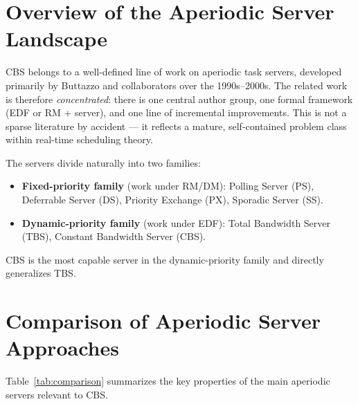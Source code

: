 \documentclass[conference]{IEEEtran}
\begin{document}
\section{Overview of the Aperiodic Server Landscape}

CBS belongs to a well-defined line of work on aperiodic task servers,
developed primarily by Buttazzo and collaborators over the 1990s--2000s.
The related work is therefore \emph{concentrated}: there is one central
author group, one formal framework (EDF or RM + server), and one line of
incremental improvements. This is not a sparse literature by accident ---
it reflects a mature, self-contained problem class within real-time
scheduling theory.

The servers divide naturally into two families:
\begin{itemize}
  \item \textbf{Fixed-priority family} (work under RM/DM): Polling
        Server (PS), Deferrable Server (DS), Priority Exchange (PX),
        Sporadic Server (SS).
  \item \textbf{Dynamic-priority family} (work under EDF): Total
        Bandwidth Server (TBS), Constant Bandwidth Server (CBS).
\end{itemize}

CBS is the most capable server in the dynamic-priority family and
directly generalizes TBS.

\section{Comparison of Aperiodic Server Approaches}

Table~\ref{tab:comparison} summarizes the key properties of the main
aperiodic servers relevant to CBS.
\end{document}
